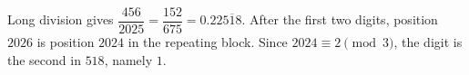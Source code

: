 Long division gives $\dfrac{456}{2025}=\dfrac{152}{675}=0.22\overline{518}$. After the first two digits, position $2026$ is position $2024$ in the repeating block. Since $2024\equiv2\pmod3$, the digit is the second in $518$, namely $\boxed1$.
